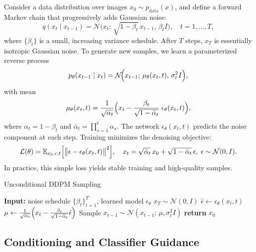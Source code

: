 \documentclass[11pt,a4paper]{article}
\begin{document}
Consider a data distribution over images $x_0\sim p_{\mathrm{data}}(x)$, and define a forward Markov chain that progressively adds Gaussian noise:
\begin{equation}\label{eq:forward}
q(x_t \mid x_{t-1}) = \mathcal{N}\!\bigl(x_t;\,\sqrt{1-\beta_t}\,x_{t-1},\,\beta_t I\bigr),\quad t=1,\dots,T,
\end{equation}
where $\{\beta_t\}$ is a small, increasing variance schedule.  After $T$ steps, $x_T$ is essentially isotropic Gaussian noise. To generate new samples, we learn a parameterized reverse process
\begin{equation}\label{eq:reverse}
p_\theta(x_{t-1}\mid x_t) 
= \mathcal{N}\!\Bigl(x_{t-1};\,\mu_\theta(x_t,t),\,\sigma_t^2 I\Bigr),
\end{equation}
with mean
\[
\mu_\theta(x_t,t)
=\frac{1}{\sqrt{\alpha_t}}\Bigl(x_t-\frac{\beta_t}{\sqrt{1-\bar\alpha_t}}\;\epsilon_\theta(x_t,t)\Bigr),
\]
where $\alpha_t = 1-\beta_t$ and $\bar\alpha_t = \prod_{s=1}^t \alpha_s$.  The network $\epsilon_\theta(x_t,t)$ predicts the noise component at each step.  Training minimizes the denoising objective:
\begin{equation}\label{eq:loss}
\mathcal{L}(\theta)
=\mathbb{E}_{x_0,\epsilon,t}\Bigl[\bigl\|\epsilon-\epsilon_\theta(x_t,t)\bigr\|^2\Bigr],\quad
x_t=\sqrt{\bar\alpha_t}\,x_0+\sqrt{1-\bar\alpha_t}\,\epsilon,\;\epsilon\sim\mathcal{N}(0,I).
\end{equation}
In practice, this simple loss yields stable training and high-quality samples.

\begin{algorithm}[htb]
\caption{Unconditional DDPM Sampling}\label{alg:ddpm}
\begin{algorithmic}[1]
  \STATE \textbf{Input:} noise schedule $\{\beta_t\}_{t=1}^T$, learned model $\epsilon_\theta$
  \STATE $x_T \sim \mathcal{N}(0,I)$
    \STATE $\hat\epsilon \leftarrow \epsilon_\theta(x_t,t)$
    \STATE $\mu \leftarrow \frac{1}{\sqrt{\alpha_t}}\Bigl(x_t - \tfrac{\beta_t}{\sqrt{1-\bar\alpha_t}}\hat\epsilon\Bigr)$
    \STATE Sample $x_{t-1}\sim \mathcal{N}(x_{t-1};\,\mu,\sigma_t^2 I)$
  \ENDFOR
  \STATE \textbf{return} $x_0$
\end{algorithmic}
\end{algorithm}

\subsection{Conditioning and Classifier Guidance}
\end{document}
